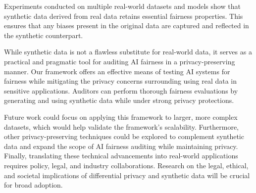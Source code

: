 \documentclass[manuscript,screen,review,anonymous]{acmart}
\begin{document}
Experiments conducted on multiple real-world datasets and models show that synthetic data derived from real data retains essential fairness properties. This ensures that any biases present in the original data are captured and reflected in the synthetic counterpart.

While synthetic data is not a flawless substitute for real-world data, it serves as a practical and pragmatic tool for auditing AI fairness in a privacy-preserving manner. Our framework offers an effective means of testing AI systems for fairness while mitigating the privacy concerns surrounding using real data in sensitive applications. Auditors can perform thorough fairness evaluations by generating and using synthetic data while under strong privacy protections.

Future work could focus on applying this framework to larger, more complex datasets, which would help validate the framework's scalability. Furthermore, other privacy-preserving techniques could be explored to complement synthetic data and expand the scope of AI fairness auditing while maintaining privacy. Finally, translating these technical advancements into real-world applications requires policy, legal, and industry collaborations. Research on the legal, ethical, and societal implications of differential privacy and synthetic data will be crucial for broad adoption.






\end{document}
